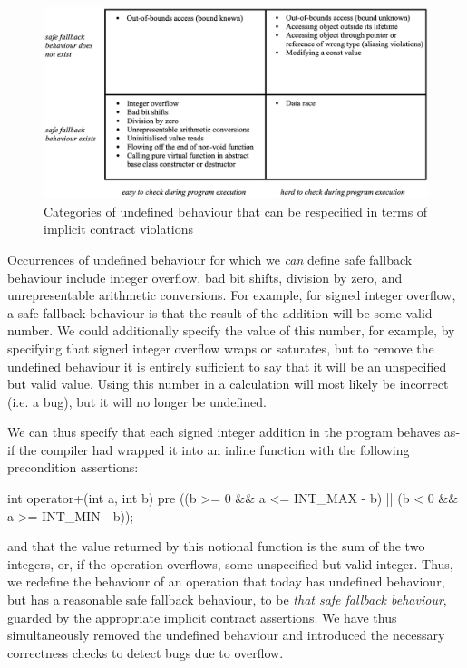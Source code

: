 \begin{figure}[b]
\begin{center}
\includegraphics[scale=0.315]{images/p3100_quadrants.png}
\end{center}
\caption{Categories of undefined behaviour that can be respecified in terms of implicit contract violations}
\label{fig_quadrants}
\end{figure}

Occurrences of undefined behaviour for which we \emph{can} define safe fallback behaviour include integer overflow, bad bit shifts, division by zero, and unrepresentable arithmetic conversions. For example, for signed integer overflow, a safe fallback behaviour is that the result of the addition will be some valid number. We could additionally specify the value of this number, for example, by specifying that signed integer overflow wraps or saturates, but to remove the undefined behaviour it is entirely sufficient to say that it will be an unspecified but valid value. Using this number in a calculation will most likely be incorrect (i.e. a bug), but it will no longer be undefined.

We can thus specify that each signed integer addition in the program behaves as-if the compiler had wrapped it into an inline function with the following precondition assertions:
\begin{codeblock}
int operator+(int a, int b)
pre ((b >= 0 && a <= INT_MAX - b) || (b < 0 && a >= INT_MIN - b));
\end{codeblock}
and that the value returned by this notional function is the sum of the two integers, or, if the operation overflows, some unspecified but valid integer. Thus, we redefine the behaviour of an operation that today has undefined behaviour, but has a reasonable safe fallback behaviour, to be \emph{that safe fallback behaviour}, guarded by the appropriate implicit contract assertions. We have thus simultaneously removed the undefined behaviour and introduced the necessary correctness checks to detect bugs due to overflow.

